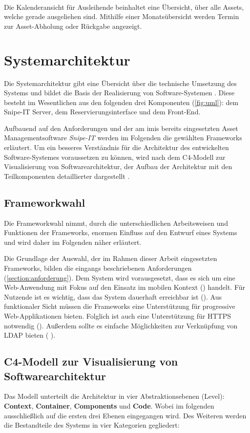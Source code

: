 {\sffamily\color{maincolor}{Ft-B-4 | Kalenderansicht für Ausleihende}}\\
Die Kalenderansicht für Ausleihende beinhaltet eine Übersicht, über alle Assets, welche gerade
ausgeliehen sind. Mithilfe einer Monatsübersicht werden Termin zur Asset-Abholung oder Rückgabe
angezeigt. 


\section{Systemarchitektur}
Die Systemarchitektur gibt eine Übersicht über die technische Umsetzung des Systems und
bildet die Basis der Realisierung von Software-Systemen \cite{dumke_software-metriken_2000}. Diese besteht im
Wesentlichen aus den folgenden drei Komponenten (\ref{fig:uml}): dem Snipe-IT Server, dem
Reservierungsinterface und dem Front-End.

Aufbauend auf den Anforderungen und der am \ac{imis} bereits eingesetzten Asset Managementsoftware
\textit{Snipe-IT} werden im Folgenden die gewählten Frameworks erläutert. Um ein besseres
Verständnis für die Architektur des entwickelten Software-Systemes voraussetzen zu können, wird nach
dem C4-Modell zur Visualisierung von Softwarearchitektur, der Aufbau der Architektur mit den
Teilkomponenten detaillierter dargestellt \cite{brown2013software}. 

\subsection{Frameworkwahl}
Die Frameworkwahl nimmt, durch die unterschiedlichen Arbeitsweisen und Funktionen der Frameworks,
enormen Einfluss auf den Entwurf eines Systems und wird daher im Folgenden näher erläutert. 
 
Die Grundlage der Auswahl, der im Rahmen dieser Arbeit eingesetzten Frameworks, bilden die eingangs
beschriebenen Anforderungen (\ref{section:anforderung}). Dem System wird vorausgesetzt, dass es sich
um eine Web-Anwendung mit Fokus auf den Einsatz im mobilen Kontext () handelt. Für
Nutzende ist es wichtig, dass das System dauerhaft erreichbar ist (). Aus funktionaler
Sicht müssen die Frameworks eine Unterstützung für progressive Web-Applikationen bieten. Folglich
ist auch eine Unterstützung für HTTPS notwendig (). Außerdem sollte es einfache
Möglichkeiten zur Verknüpfung von LDAP bieten ( ).


\subsection{C4-Modell zur Visualisierung von Softwarearchitektur}
Das Modell unterteilt die Architektur in vier Abstraktionsebenen (Level): \textbf{Context},
\textbf{Container}, \textbf{Components} und \textbf{Code}. Wobei im folgenden ausschließlich
auf die ersten drei Ebenen eingegangen wird. Des Weiteren werden die Bestandteile des
Systems in vier Kategorien gegliedert:

